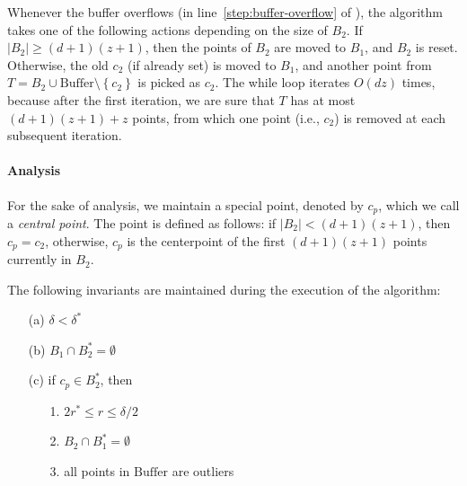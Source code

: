\documentclass[envcountsame]{cls/cccg15}
\newcommand{\cp}{c_p}
\newcommand{\dz}{(d + 1)(z + 1)}
\newcommand{\Buffer}{\ensuremath{\text{Buffer}}}
\newcommand{\set}[1]{\left\{ #1 \right\}}
\newcommand{\card}[1]{\left|{#1}\right|}
\newcommand{\lee}{\leqslant}
\newcommand{\gee}{\geqslant}
\renewcommand{\le}{\lee}
\renewcommand{\ge}{\gee}
\begin{document}
Whenever the buffer overflows (in line~\ref{step:buffer-overflow} of ),
the algorithm takes one of the following actions
depending on the size of $B_2$. 
If $|B_2| \ge \dz$, then the points of $B_2$ are moved to $B_1$, and $B_2$ is reset.
Otherwise, the old $c_2$ (if already set) is moved to $B_1$,
and another point from $T = B_2 \cup \Buffer \setminus \set{c_2}$ is picked as $c_2$.
The while loop iterates $O(dz)$ times,
because after the first iteration, we are sure 
that $T$ has at most $\dz + z$ points, from which 
one point (i.e., $c_2$) is removed at each subsequent iteration.


\paragraph{Analysis}
For the sake of analysis, we maintain a special point,
denoted by $\cp$, %
which we call a \emph{central point}.
The point is defined as follows:
if $\card{B_2} < \dz$, then $\cp = c_2$, otherwise,
$\cp$ is the centerpoint of the first $\dz$ points currently in $B_2$.

\begin{lemma}
\label{lem:invariants}
	The following invariants are maintained during the execution of the algorithm:

\begin{enumerate}
\item [(a)] $\delta < \delta^*$ %
\item [(b)] $B_1 \cap B_2^* = \emptyset$
\item [(c)]  if $\cp \in B_2^*$, then 
	\begin{enumerate}
		\item [1.] $2r^* \le r \le \delta /2$
		\item [2.] $B_2 \cap B_1^* = \emptyset$
		\item [3.] all points in $\Buffer$ are outliers
	\end{enumerate}
\end{enumerate}
\end{lemma}
\end{document}
